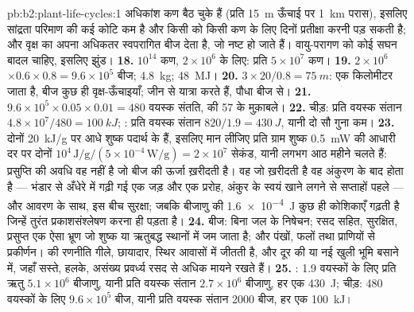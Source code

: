 \begin{solution}{pb:b2:plant-life-cycles:1}
अधिकांश कण बैठ चुके हैं (प्रति \qty{15}{m} ऊँचाई पर \qty{1}{km}
परास), इसलिए सांद्रता परिमाण की कई कोटि कम है और किसी  को किसी कण
के लिए दिनों प्रतीक्षा करनी पड़ सकती है; और वृक्ष का अपना 
अधिकतर स्वपरागित बीज देता है, जो नष्ट हो जाते हैं। वायु-परागण को कोई
सघन बादल चाहिए, इसलिए झुंड।
\textbf{18.} $10^{14}$ कण, $2\times 10^{6}$  के लिए: प्रति  $5\times
10^{7}$ कण।
\textbf{19.} $2\times 10^{6}$  $\times 0.6\times 0.8 = 9.6\times
10^{5}$ बीज; \qty{4.8}{kg}; \qty{48}{MJ}।
\textbf{20.} $3\times 20/0.8 = \qty{75}{m}$:  एक
किलोमीटर जाता है, बीज कुछ ही वृक्ष-ऊँचाइयाँ; जीन  से
यात्रा करते हैं, पौधा बीज से।
\textbf{21.} $9.6\times 10^{5}\times 0.05\times 0.01 = 480$ वयस्क
संतति,  की 57 के मुक़ाबले।
\textbf{22.} चीड़: प्रति वयस्क संतान $4.8\times 10^{7}/480 = \qty{100}{kJ}$;
: प्रति वयस्क संतान $820/1.9 = \qty{430}{J}$, यानी दो
सौ गुना कम।
\textbf{23.} दोनों \qty{20}{kJ/g} पर आधे शुष्क पदार्थ के हैं, इसलिए
मान लीजिए प्रति ग्राम शुष्क \qty{0.5}{mW} की आधारी दर पर दोनों $10^{4}\,
\text{J/g}/(5\times 10^{-4}\,\text{W/g}) = 2\times 10^{7}$ सेकंड, यानी
लगभग आठ महीने चलते हैं: प्रसुप्ति की अवधि वह नहीं है जो बीज की ऊर्जा
ख़रीदती है। वह जो ख़रीदती है वह अंकुरण के बाद होता है --- भंडार से
अँधेरे में गढ़ी गई एक जड़ और एक प्ररोह, अंकुर के स्वयं खाने लगने से
सप्ताहों पहले --- और आवरण के साथ, इस बीच सुरक्षा; जबकि बीजाणु की
\qty{1.6e-4}{J} कुछ ही कोशिकाएँ गढ़ती है जिन्हें तुरंत प्रकाशसंश्लेषण
करना ही पड़ता है।
\textbf{24.} बीज: बिना जल के निषेचन; रसद सहित, सुरक्षित, प्रसुप्त एक
ऐसा भ्रूण जो शुष्क या ऋतुबद्ध स्थानों में जम जाता है; और पंखों, फलों
तथा प्राणियों से प्रकीर्णन।  की रणनीति
गीले, छायादार, स्थिर आवासों में जीतती है, और दूर की या नई खुली भूमि
बसाने में, जहाँ सस्ते, हलके, असंख्य प्रवर्ध्य रसद से अधिक मायने रखते
हैं।
\textbf{25.} : 1.9 वयस्कों के लिए प्रति ऋतु $5.1\times 10^{6}$ बीजाणु,
यानी प्रति वयस्क संतान $2.7\times 10^{6}$ बीजाणु, हर एक \qty{430}{J};
चीड़: 480 वयस्कों के लिए $9.6\times 10^{5}$ बीज, यानी प्रति
वयस्क संतान \num{2000} बीज, हर एक \qty{100}{kJ}।
\end{solution}

